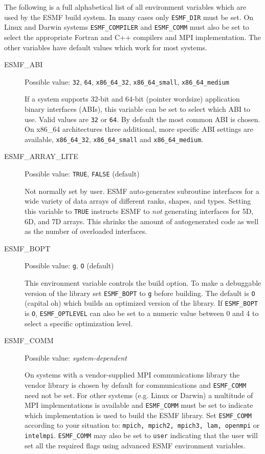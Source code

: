 The following is a full alphabetical list of all environment variables which
are used by the ESMF build system. In many cases only {\tt ESMF\_DIR} must be 
set. On Linux and Darwin systems {\tt ESMF\_COMPILER} and {\tt ESMF\_COMM} must
also be set to select the appropriate Fortran and C++ compilers and MPI 
implementation. The other variables have default values which work for
most systems.

\begin{description}

\item[ESMF\_ABI]
Possible value: {\tt 32}, {\tt 64}, {\tt x86\_64\_32}, {\tt x86\_64\_small}, {\tt x86\_64\_medium}

If a system supports 32-bit and 64-bit (pointer wordsize) application binary
interfaces (ABIs), this variable can be set to select which ABI to use. Valid 
values are {\tt 32} or {\tt 64}. By default the most common ABI is chosen. On
x86\_64 architectures three additional, more specific ABI settings are available,
{\tt x86\_64\_32}, {\tt x86\_64\_small} and {\tt x86\_64\_medium}.

\item[ESMF\_ARRAY\_LITE]
Possible value: {\tt TRUE}, {\tt FALSE} (default)

Not normally set by user. ESMF auto-generates subroutine interfaces for a wide
variety of data arrays of different ranks, shapes, and types. Setting this
variable to {\tt TRUE} instructs ESMF to {\em not} generating interfaces for
5D, 6D, and 7D arrays. This shrinks the amount of autogenerated code as well
as the number of overloaded interfaces.

\item[ESMF\_BOPT] 
Possible value: {\tt g}, {\tt O} (default)

This environment variable controls the build option. To make a debuggable
version of the library set {\tt ESMF\_BOPT} to {\tt g} before building. The 
default is {\tt O} (capital oh) which builds an optimized version of the
library. If {\tt ESMF\_BOPT} is {\tt O}, {\tt ESMF\_OPTLEVEL} can also be set
to a numeric value between 0 and 4 to select a specific optimization level.

\item[ESMF\_COMM]
Possible value: {\em system-dependent}

On systems with a vendor-supplied MPI communications library the vendor library 
is chosen by default for communications and {\tt ESMF\_COMM} need not be set.
For other systems (e.g. Linux or Darwin) a multitude of MPI implementations is
available and {\tt ESMF\_COMM} must be set to indicate which implementation is
used to build the ESMF library. Set {\tt ESMF\_COMM} according to your situation
to: {\tt mpich, mpich2, mpich3, lam, openmpi} or {\tt intelmpi}. {\tt ESMF\_COMM} may
also be set to {\tt user} indicating that the user will set all the required
flags using advanced ESMF environment variables.


\end{description}
